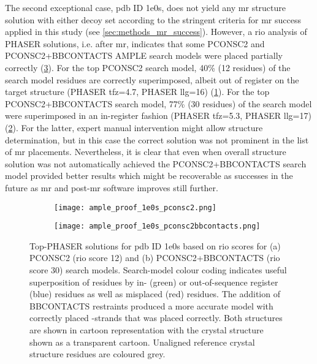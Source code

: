 The second exceptional case, \gls{pdb} ID 1e0s, does not yield any \gls{mr} structure solution with either decoy set according to the stringent criteria for \gls{mr} success applied in this study (see \cref{sec:methods_mr_success}). However, a \gls{rio} analysis of PHASER solutions, i.e. after \gls{mr}, indicates that some PCONSC2 and PCONSC2+BBCONTACTS AMPLE search models were placed partially correctly (\cref{fig:ample_proof_example_1e0s}). For the top PCONSC2 search model, 40\% (12 residues) of the search model residues are correctly superimposed, albeit out of register on the target structure (PHASER \gls{tfz}=4.7, PHASER \gls{llg}=16) (\cref{fig:ample_proof_1e0s_pconsc2}). For the top PCONSC2+BBCONTACTS search model, 77\% (30 residues) of the search model were superimposed in an in-register fashion (PHASER \gls{tfz}=5.3, PHASER \gls{llg}=17) (\cref{fig:ample_proof_1e0s_pconsc2bbcontacts}). For the latter, expert manual intervention might allow structure determination, but in this case the correct solution was not prominent in the list of \gls{mr} placements. Nevertheless, it is clear that even when overall structure solution was not automatically achieved the PCONSC2+BBCONTACTS search model provided better results which might be recoverable as successes in the future as \gls{mr} and post-\gls{mr} software improves still further.

\begin{figure}[H]
    \centering
    \begin{subfigure}[b]{0.48\textwidth}
        \centering
        \texttt{[image: ample\_proof\_1e0s\_pconsc2.png]}
        \caption{}
        \label{fig:ample_proof_1e0s_pconsc2}
    \end{subfigure}
    \begin{subfigure}[b]{0.48\textwidth}
        \centering
        \texttt{[image: ample\_proof\_1e0s\_pconsc2bbcontacts.png]}
        \caption{}
        \label{fig:ample_proof_1e0s_pconsc2bbcontacts}
    \end{subfigure}

    \caption[Top-PHASER solutions for target 1e0s]{Top-PHASER solutions for \gls{pdb} ID 1e0s based on \gls{rio} scores for (a) PCONSC2 (\gls{rio} score 12) and (b) PCONSC2+BBCONTACTS (\gls{rio} score 30) search models. Search-model colour coding indicates useful superposition of residues by in- (green) or out-of-sequence register (blue) residues as well as misplaced (red) residues. The addition of BBCONTACTS restraints produced a more accurate model with correctly placed \textbeta-strands that was placed correctly. Both structures are shown in cartoon representation with the crystal structure shown as a transparent cartoon. Unaligned reference crystal structure residues are coloured grey.}
    \label{fig:ample_proof_example_1e0s}
\end{figure}


